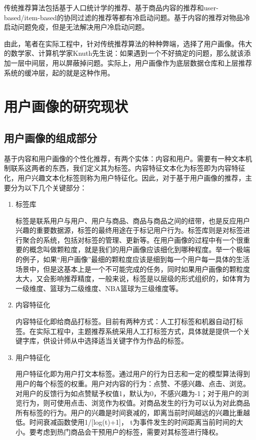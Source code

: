 	传统推荐算法包括基于人口统计学的推荐\citep{social-filter}、基于商品内容的推荐\citep{content-based}和user-based/item-based的协同过滤\citep{collab-filter}的推荐等都有冷启动问题。基于内容的推荐对物品冷启动问题免疫，但是无法解决用户冷启动问题\citep{cold-start}。

	由此，笔者在实际工程中，针对传统推荐算法的种种弊端，选择了用户画像。伟大的数学家、计算机学家Knuth先生说：如果遇到一个不好搞定的问题，那么就该添加一层中间层，用以屏蔽掉问题。实际上，用户画像作为底层数据仓库和上层推荐系统的缓冲层，起的就是这种作用。

	\section{用户画像的研究现状}
		\subsection{用户画像的组成部分}
		基于内容和用户画像的个性化推荐，有两个实体：内容和用户。需要有一种文本机制联系这两者的东西，我们定义其为标签。内容特征文本化为标签即为内容特征化，用户兴趣文本化标签则称为用户特征化\citep{user-profile,user-profile1,user-profile2,user-profile3,user-profile4}。因此，对于基于用户画像的推荐，主要分为以下几个关键部分：
		\begin{enumerate}[(1)]
		\item 标签库

		标签是联系用户与用户、用户与商品、商品与商品之间的纽带，也是反应用户兴趣的重要数据源，标签的最终用途在于标记用户行为。标签库则是对标签进行聚合的系统，包括对标签的管理、更新等。在用户画像的过程中有一个很重要的概念叫做颗粒度，就是我们的用户画像应该细化到哪种程度。举一个极端的例子，如果“用户画像”最细的颗粒度应该是细到每一个用户每一具体的生活场景中，但是这基本上是一个不可能完成的任务，同时如果用户画像的颗粒度太大，又会影响推荐精度，一般来说，标签是以层级的形式组织的，如体育为一级维度、篮球为二级维度、NBA篮球为三级维度等。

		\item 内容特征化

		内容特征化即给商品打标签。目前有两种方式：人工打标签和机器自动打标签。在实际工程中，主题推荐系统采用人工打标签方式，具体就是提供一个关键字库，供设计师从中选择适当关键字作为作品的标签。

		\item 用户特征化

		用户特征化即为用户打文本标签。通过用户的行为日志和一定的模型算法得到用户的每个标签的权重。用户对内容的行为：点赞、不感兴趣、点击、浏览。对用户的反馈行为如点赞赋予权值1，默认为0，不感兴趣为-1；对于用户的浏览行为，则可使用点击、浏览作为权值。对商品发生的行为可以认为对此商品所有标签的行为。用户的兴趣是时间衰减的，即离当前时间越远的兴趣比重越低。时间衰减函数使用1/[log(t)+1]， t为事件发生的时间距离当前时间的大小。要考虑到热门商品会干预用户的标签，需要对其标签进行降权。
		\end{enumerate}

